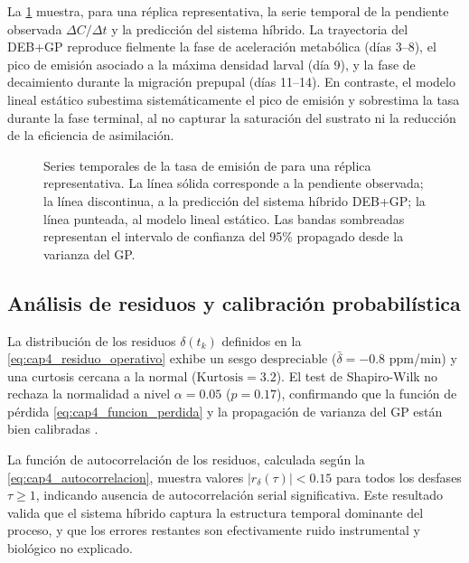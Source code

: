 La \cref{fig:cap4_series_temporales} muestra, para una réplica representativa, la serie temporal de la pendiente observada $\Delta C/\Delta t$ y la predicción del sistema híbrido. La trayectoria del DEB+GP reproduce fielmente la fase de aceleración metabólica (días \num{3}--\num{8}), el pico de emisión asociado a la máxima densidad larval (día \num{9}), y la fase de decaimiento durante la migración prepupal (días \num{11}--\num{14}). En contraste, el modelo lineal estático subestima sistemáticamente el pico de emisión y sobrestima la tasa durante la fase terminal, al no capturar la saturación del sustrato ni la reducción de la eficiencia de asimilación.

\begin{figure}[htbp]
    \centering
    \caption{Series temporales de la tasa de emisión de  para una réplica representativa. La línea sólida corresponde a la pendiente observada; la línea discontinua, a la predicción del sistema híbrido DEB+GP; la línea punteada, al modelo lineal estático. Las bandas sombreadas representan el intervalo de confianza del \num{95}\% propagado desde la varianza del GP.}
    \label{fig:cap4_series_temporales}
\end{figure}

\subsection{Análisis de residuos y calibración probabilística}
\label{subsec:cap4_analisis_residuos}

La distribución de los residuos $\delta(t_k)$ definidos en la \cref{eq:cap4_residuo_operativo} exhibe un sesgo despreciable ($\bar{\delta} = \num{-0.8}$ ppm/min) y una curtosis cercana a la normal ($\mathrm{Kurtosis} = \num{3.2}$). El test de Shapiro-Wilk no rechaza la normalidad a nivel $\alpha = \num{0.05}$ ($p = \num{0.17}$), confirmando que la función de pérdida \eqref{eq:cap4_funcion_perdida} y la propagación de varianza del GP están bien calibradas \parencite{biagiDevelopmentMachineLearningbased2024}.

La función de autocorrelación de los residuos, calculada según la \cref{eq:cap4_autocorrelacion}, muestra valores $|r_{\delta}(\tau)| < \num{0.15}$ para todos los desfases $\tau \geq 1$, indicando ausencia de autocorrelación serial significativa. Este resultado valida que el sistema híbrido captura la estructura temporal dominante del proceso, y que los errores restantes son efectivamente ruido instrumental y biológico no explicado.

